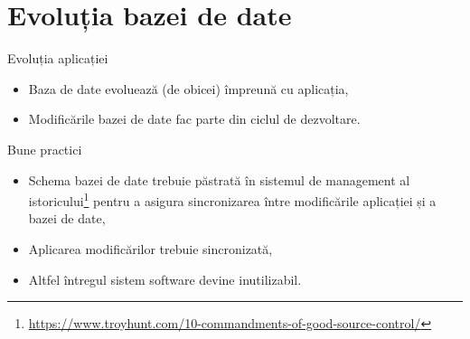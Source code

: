 \documentclass[presentation]{beamer}
\begin{document}
\section{Evoluția bazei de date}
\label{sec:orgb369eb8}
\begin{frame}[label={sec:org4894448}]{Evoluția aplicației}
\begin{itemize}
\item Baza de date evoluează (de obicei) împreună cu aplicația,
\item Modificările bazei de date fac parte din ciclul de dezvoltare.
\end{itemize}
\end{frame}
\begin{frame}[label={sec:org38fd652}]{Bune practici}
\begin{itemize}
\item Schema bazei de date trebuie păstrată în sistemul de management al istoricului\footnote{\url{https://www.troyhunt.com/10-commandments-of-good-source-control/}} pentru a asigura sincronizarea între modificările aplicației și a bazei de date,
\item Aplicarea modificărilor trebuie sincronizată,
\item Altfel întregul sistem software devine inutilizabil.
\end{itemize}
\end{frame}
\end{document}
